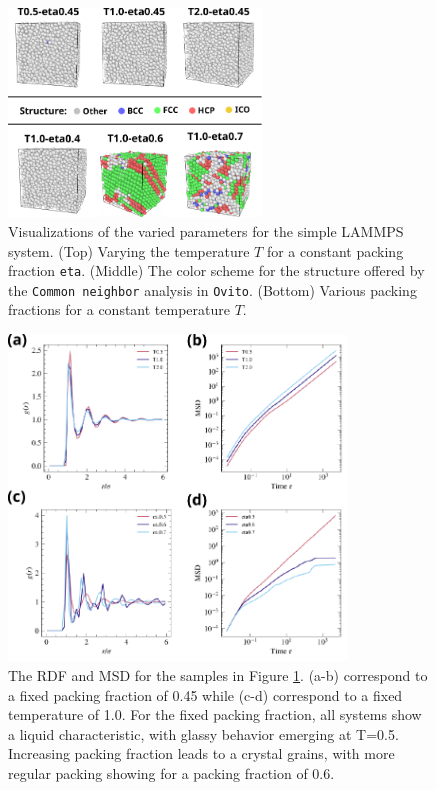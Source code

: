 \documentclass[10pt,a4paper]{labreport}
\begin{document}
\begin{figure}[htpb]
  \centering 
  \includegraphics[width = 0.6\textwidth]{figs/ass3_struct.pdf}
  \caption{Visualizations of the varied parameters for the simple LAMMPS system. (Top) Varying the temperature $T$ for a constant packing fraction \texttt{eta}. (Middle) The color scheme for the structure offered by the \texttt{Common neighbor} analysis in \texttt{Ovito}. (Bottom) Various packing fractions for a constant temperature $T$. }
  \label{fig:ass3_struc}
\end{figure}
\begin{figure}[htpb]
  \centering 
  \includegraphics[width = 0.8\textwidth]{figs/ass3_rdf-msd.pdf}
  \caption{The RDF and MSD for the samples in Figure \ref{fig:ass3_struc}. (a-b) correspond to a fixed packing fraction of 0.45 while (c-d) correspond to a fixed temperature of 1.0. For the fixed packing fraction, all systems show a liquid characteristic, with glassy behavior emerging at T=0.5. Increasing packing fraction leads to a crystal grains, with more regular packing showing for a packing fraction of 0.6. }
  \label{fig:ass3_rdf-msd}
\end{figure}
\end{document}
